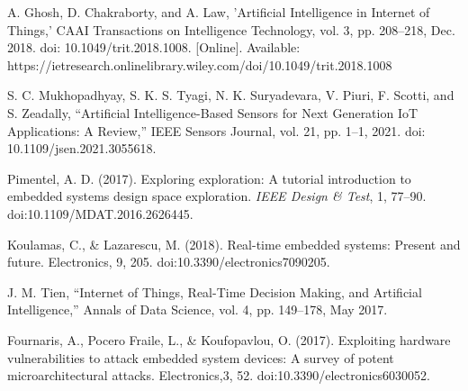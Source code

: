 \documentclass[conference]{IEEEtran}
\begin{document}
\begin{thebibliography}{00}
 A. Ghosh, D. Chakraborty, and A. Law, 
'Artificial Intelligence in Internet of Things,' 
CAAI Transactions on Intelligence Technology, vol. 3, pp. 208--218, Dec. 2018. doi: 10.1049/trit.2018.1008. [Online]. Available: https://ietresearch.onlinelibrary.wiley.com/doi/10.1049/trit.2018.1008

 S. C. Mukhopadhyay, S. K. S. Tyagi, N. K. Suryadevara, V. Piuri, F. Scotti, and S. Zeadally, 
``Artificial Intelligence-Based Sensors for Next Generation IoT Applications: A Review,'' 
IEEE Sensors Journal, vol. 21, pp. 1--1, 2021. doi: 10.1109/jsen.2021.3055618.

Pimentel, A. D. (2017). Exploring exploration: A tutorial introduction to embedded systems design space exploration. \textit{IEEE Design \& Test}, 1, 77--90. doi:10.1109/MDAT.2016.2626445.

Koulamas, C., \& Lazarescu, M. (2018). Real-time embedded systems: Present and future. Electronics, 9, 205. doi:10.3390/electronics7090205.

 J. M. Tien, 
``Internet of Things, Real-Time Decision Making, and Artificial Intelligence,'' 
Annals of Data Science, vol. 4, pp. 149--178, May 2017.

Fournaris, A., Pocero Fraile, L., \& Koufopavlou, O. (2017). Exploiting hardware vulnerabilities to attack embedded system devices: A survey of potent microarchitectural attacks. Electronics,3, 52. doi:10.3390/electronics6030052.

\end{thebibliography}


\end{document}
